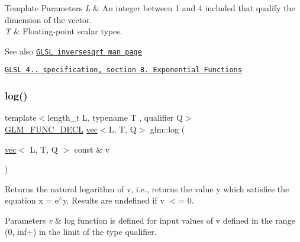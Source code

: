 \begin{DoxyTemplParams}{Template Parameters}
{\em L} & An integer between 1 and 4 included that qualify the dimension of the vector. \\
\hline
{\em T} & Floating-\/point scalar types.\\
\hline
\end{DoxyTemplParams}
\begin{DoxySeeAlso}{See also}
\href{http://www.opengl.org/sdk/docs/manglsl/xhtml/inversesqrt.xml}{\tt G\+L\+SL inversesqrt man page} 

\href{http://www.opengl.org/registry/doc/GLSLangSpec.4.20.8.pdf}{\tt G\+L\+SL 4.. specification, section 8. Exponential Functions} 
\end{DoxySeeAlso}
\mbox{\label{group__core__func__exponential_ga918c9f3fd086ce20e6760c903bd30fa9}} 
\subsubsection{\texorpdfstring{log()}{log()}}
{\footnotesize\ttfamily template$<$length\+\_\+t L, typename T , qualifier Q$>$ \\
\hyperlink{setup_8hpp_ab2d052de21a70539923e9bcbf6e83a51}{G\+L\+M\+\_\+\+F\+U\+N\+C\+\_\+\+D\+E\+CL} \hyperlink{structglm_1_1vec}{vec}$<$L, T, Q$>$ glm\+::log (\begin{DoxyParamCaption}\item[{\hyperlink{structglm_1_1vec}{vec}$<$ L, T, Q $>$ const \&}]{v }\end{DoxyParamCaption})}

Returns the natural logarithm of v, i.\+e., returns the value y which satisfies the equation x = e$^\wedge$y. Results are undefined if v $<$= 0.


\begin{DoxyParams}{Parameters}
{\em v} & log function is defined for input values of v defined in the range (0, inf+) in the limit of the type qualifier. \\
\hline
\end{DoxyParams}

